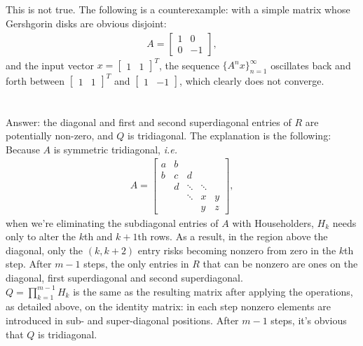 \documentclass[11pt]{article}
\begin{document}
\subsection{}
This is not true. The following is a counterexample: with a simple matrix whose Gershgorin disks are obvious disjoint:
\begin{equation}\begin{split} 
A = \begin{bmatrix}1&0\\0&-1 \end{bmatrix}, 
\end{split}\nonumber\end{equation}
and the input vector $x = \begin{bmatrix} 1&1\end{bmatrix}^T $, the sequence $\{A^nx\}_{n=1}^{\infty}$ oscillates back and forth between $\begin{bmatrix} 1&1\end{bmatrix}^T $ and $\begin{bmatrix} 1 & -1\end{bmatrix} $, which clearly does not converge.

\section{}

\section{}
\subsection{}
Answer: the diagonal and first and second superdiagonal entries of $R$ are potentially non-zero, and $Q$ is tridiagonal. The explanation is the following:\\[0.3cm]
Because $A$ is symmetric tridiagonal, \textit{i.e.} 
\begin{equation}\begin{split} 
A = \begin{bmatrix} 
a & b\\
b & c & d\\
& d & \ddots & \ddots\\
& & \ddots & x  & y \\
& & & y & z
\end{bmatrix},
\end{split}\nonumber\end{equation} 
when we're eliminating the subdiagonal entries of $A$ with Householders, $H_k$ needs only to alter the $k$th and $k+1$th rows. As a result, in the region above the diagonal, only the $(k,k+2)$ entry risks becoming nonzero from zero in the $k$th step. After $m-1$ steps, the only entries in $R$ that can be nonzero are ones on the diagonal, first superdiagonal and second superdiagonal. \\[0.3cm]
$Q=\prod_{k=1}^{m-1}H_k$ is the same as the resulting matrix after applying the operations, as detailed above, on the identity matrix: in each step nonzero elements are introduced in sub- and super-diagonal positions. After $m-1$ steps, it's obvious that $Q$ is tridiagonal.
\end{document}
